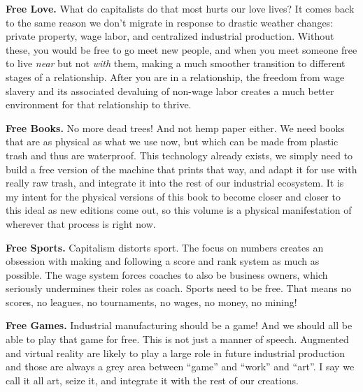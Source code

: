 \textbf{Free Love.} What do capitalists do that most hurts our love
lives? It comes back to the same reason we don't migrate in response to
drastic weather changes: private property, wage labor, and centralized
industrial production. Without these, you would be free to go meet new
people, and when you meet someone free to live \emph{near} but not
\emph{with} them, making a much smoother transition to different stages
of a relationship. After you are in a relationship, the freedom from
wage slavery and its associated devaluing of non-wage labor creates a
much better environment for that relationship to thrive.

\textbf{Free Books.} No more dead trees! And not hemp paper either. We
need books that are as physical as what we use now, but which can be
made from plastic trash and thus are waterproof. This technology already
exists, we simply need to build a free version of the machine that
prints that way, and adapt it for use with really raw trash, and
integrate it into the rest of our industrial ecosystem. It is my intent
for the physical versions of this book to become closer and closer to
this ideal as new editions come out, so this volume is a physical
manifestation of wherever that process is right now.

\textbf{Free Sports.} Capitalism distorts sport. The focus on numbers
creates an obsession with making and following a score and rank system
as much as possible. The wage system forces coaches to also be business
owners, which seriously undermines their roles as coach. Sports need to
be free. That means no scores, no leagues, no tournaments, no wages, no
money, no mining!

\textbf{Free Games.} Industrial manufacturing should be a game! And we
should all be able to play that game for free. This is not just a manner
of speech. Augmented and virtual reality are likely to play a large role
in future industrial production and those are always a grey area between
``game'' and ``work'' and ``art''. I say we call it all art, seize it,
and integrate it with the rest of our creations.
